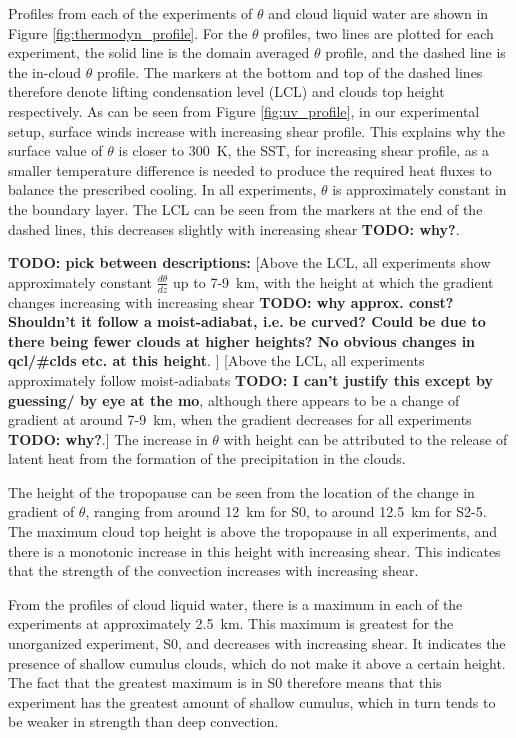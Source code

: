 \documentclass[11pt,a4paper]{article}
\newcommand\todo[1]{\textbf{TODO: #1}}
\begin{document}
Profiles from each of the experiments of $\theta$ and cloud liquid water are shown in Figure \ref{fig:thermodyn_profile}. For the $\theta$ profiles, two lines are plotted for each experiment, the solid line is the domain averaged $\theta$ profile, and the dashed line is the in-cloud $\theta$ profile. The markers at the bottom and top of the dashed lines therefore denote lifting condensation level (LCL) and clouds top height respectively. As can be seen from Figure \ref{fig:uv_profile}, in our experimental setup, surface winds increase with increasing shear profile. This explains why the surface value of $\theta$ is closer to \SI{300}{K}, the SST, for increasing shear profile, as a smaller temperature difference is needed to produce the required heat fluxes to balance the prescribed cooling. In all experiments, $\theta$ is approximately constant in the boundary layer. The LCL can be seen from the markers at the end of the dashed lines, this decreases slightly with increasing shear \todo{why?}. 

\todo{pick between descriptions:}
[Above the LCL, all experiments show approximately constant $\frac{d \theta}{dz}$ up to \SI{7}{}-\SI{9}{km}, with the height at which the gradient changes increasing with increasing shear \todo{why approx. const? Shouldn't it follow a moist-adiabat, i.e. be curved? Could be due to there being fewer clouds at higher heights? No obvious changes in qcl/#clds etc. at this height}. ]
[Above the LCL, all experiments approximately follow moist-adiabats \todo{I can't justify this except by guessing/ by eye at the mo}, although there appears to be a change of gradient at around \SI{7}{}-\SI{9}{km}, when the gradient decreases for all experiments \todo{why?}.] The increase in $\theta$ with height can be attributed to the release of latent heat from the formation of the precipitation in the clouds.

The height of the tropopause can be seen from the location of the change in gradient of $\theta$, ranging from around \SI{12}{km} for S0, to around \SI{12.5}{km} for S2-5. The maximum cloud top height is above the tropopause in all experiments, and there is a monotonic increase in this height with increasing shear. This indicates that the strength of the convection increases with increasing shear.

From the profiles of cloud liquid water, there is a maximum in each of the experiments at approximately \SI{2.5}{km}. This maximum is greatest for the unorganized experiment, S0, and decreases with increasing shear. It indicates the presence of shallow cumulus clouds, which do not make it above a certain height. The fact that the greatest maximum is in S0 therefore means that this experiment has the greatest amount of shallow cumulus, which in turn tends to be weaker in strength than deep convection.
\end{document}
